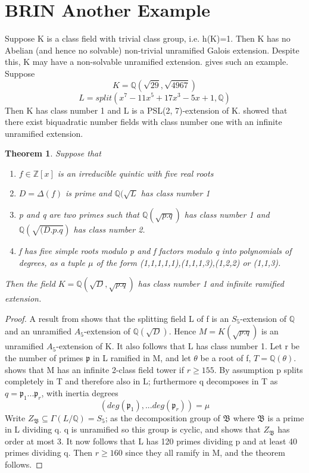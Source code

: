 \documentclass[preprint,12pt,leqno]{elsarticle}
\newtheorem{theorem}{Theorem}
\begin{document}
\section{BRIN Another Example}
Suppose K is a class field with trivial class group, i.e. h(K)=1. Then K has no Abelian (and hence no
solvable) non-trivial unramified Galois extension. Despite this, K may have a non-solvable unramified extension. \cite{BRIN} gives such an example. Suppose
\begin{equation}
   K=\mathbb{Q}(\sqrt{29},\sqrt{4967}) 
\end{equation}
\begin{equation}
   L=split(x^7 - 11x^5 + 17x^3 - 5x + 1,\mathbb{Q})
\end{equation}
Then K has class number 1 and L is a PSL(2, 7)-extension of K.
\cite{MAIR} showed that there exist biquadratic number fields with class number one with an infinite unramified extension. 
\begin{theorem}
\cite{BRIN} Suppose that \begin{enumerate}
    \item $f\in \mathbb{Z}[x]$ is an irreducible quintic with five real roots
    \item $D=\Delta(f)$ is prime and $\mathbb{Q}(\sqrt{L}$ has class number 1
    \item p and q are two primes such that $\mathbb{Q}(\sqrt{p.q})$ has class number 1 and $\mathbb{Q}(\sqrt{(D.p.q})$ has class number 2.
    \item f has five simple roots modulo p and f factors modulo q into polynomials of degrees, as a tuple $\mu$ of the form (1,1,1,1,1),(1,1,1,3),(1,2,2) or (1,1,3).
\end{enumerate}
Then the field $K=\mathbb{Q}(\sqrt{D},\sqrt{p.q})$ has class number 1 and infinite ramified extension.
\end{theorem}
\begin{proof}
A result from \cite{KOND} shows that the splitting field L
of f is an $S_5$-extension of $\mathbb{Q}$ and an unramified $A_5$-extension of $\mathbb{Q}(\sqrt{D})$. Hence $M=K(\sqrt{p.q})$ is an
unramified $A_5$-extension of K. It also follows that L has class number 1.
\smallskip \newline
Let r be the number of primes $\mathfrak{p}$ in L ramified in M, and let $\theta$ be a root of f, $T = \mathbb{Q}(\theta)$. \cite{MAR1} shows that M has an infinite 2-class field tower if $r\geq 155$. By assumption p splits completely in T and therefore also in L; furthermore q decomposes in T as $q = \mathfrak{p}_1...\mathfrak{p}_r$, with inertia degrees
\begin{equation}
    (deg(\mathfrak{p}_1),...deg(\mathfrak{p}_r))=\mu 
\end{equation}
Write $Z_\mathfrak{B}\subseteq\Gamma(L/\mathbb{Q}) = S_5$; as the decomposition group of $\mathfrak{B}$ where $\mathfrak{B}$ is a prime in L dividing q. q is unramified so this group is cyclic, and \cite{ART1} shows that $Z_\mathfrak{B}$ has order at most 3.  It now follows that L has 120 primes dividing p and at least 40 primes dividing q. Then $r\geq 160$ since they all ramify in M, and the theorem follows.
\end{proof}
\end{document}
